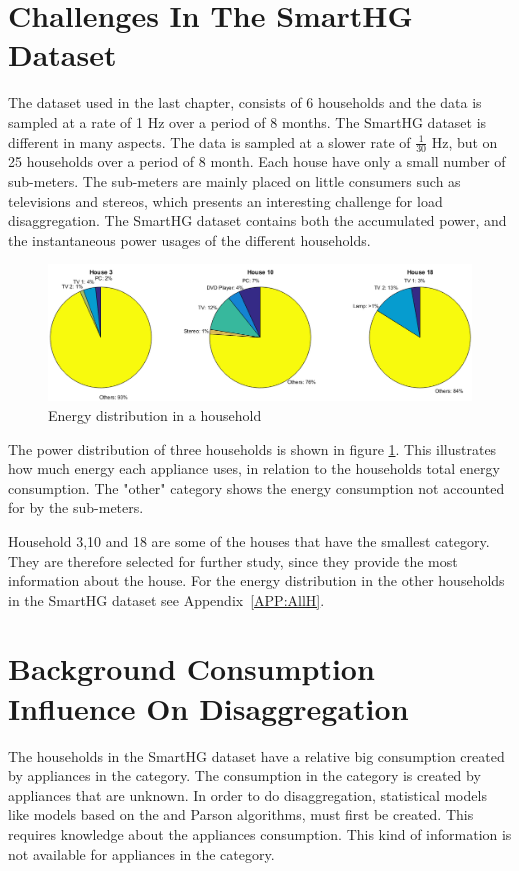 \section{Challenges In The SmartHG Dataset} 
The  dataset used in the last chapter, consists of 6 households and the data is sampled at a rate of 1 Hz over a period of 8 months. The SmartHG dataset is different in many aspects. The data is sampled at a slower rate of $\frac{1}{30}$ Hz, but on 25 households over a period of 8 month. Each house have only a small number of sub-meters. The sub-meters are mainly placed on little consumers such as televisions and stereos, which presents an interesting challenge for load disaggregation. The SmartHG dataset contains both the accumulated power, and the instantaneous power usages of the different households.

\begin{figure}[H]
\centering
\includegraphics[width=1\textwidth]{billeder/TotalPie.png}
\caption{Energy distribution in a household}
\label{fig:SLC}
\end{figure}

The power distribution of three households is shown in figure \ref{fig:SLC}. This illustrates how much energy each appliance uses, in relation to the households total energy consumption. The "other" category shows the energy consumption not accounted for by the sub-meters.  

Household 3,10 and 18 are some of the houses that have the smallest  category. They are therefore selected for further study, since they provide the most information about the house. For the energy distribution in the other households in the SmartHG dataset see Appendix~\ref{APP:AllH}. 

\section{Background Consumption Influence On Disaggregation}
\label{sec:AppNoise}
The households in the SmartHG dataset have a relative big consumption created by appliances in the  category. The consumption in the  category is created by appliances that are unknown. In order to do disaggregation, statistical models like models based on the  and Parson algorithms, must first be created. This requires knowledge about the appliances consumption. This kind of information is not available for appliances in the  category. 

